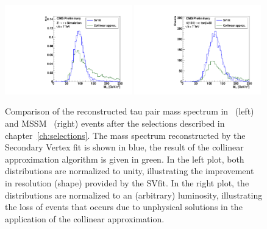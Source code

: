 \begin{figure}[t]
\begin{center}
\includegraphics*[width=0.49\textwidth]{svfit_chapter/figures/sv_fit_approval_plots/sv_vs_coll_ZTT_normed.pdf}
\includegraphics*[width=0.49\textwidth]{svfit_chapter/figures/sv_fit_approval_plots/sv_vs_coll_A120.pdf}
\caption[Comparison of SVfit with the Collinear Approximation
algorithm]{Comparison of the reconstructed tau pair mass spectrum in
\ZTT~(left) and MSSM ~(right) events after the selections described in
chapter~\ref{ch:selections}.  The mass spectrum reconstructed by the Secondary
Vertex fit is shown in blue, the result of the collinear approximation algorithm
is given in green.  In the left plot, both distributions are normalized to
unity, illustrating the improvement in resolution (shape) provided by the SVfit.
In the right plot, the distributions are normalized to an (arbitrary)
luminosity, illustrating the loss of events that occurs due to unphysical
solutions in the application of the collinear approximation.}

\label{fig:SVversusCollinear}
\end{center}
\end{figure} 

